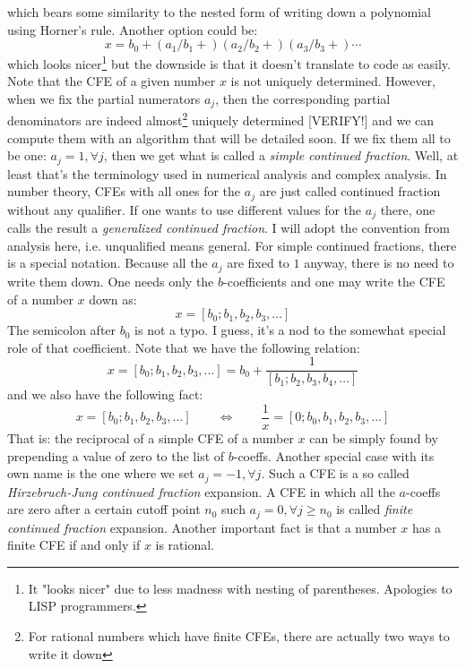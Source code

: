which bears some similarity to the nested form of writing down a polynomial using Horner's rule. Another option could be:
\begin{equation}
x = b_0 + (a_1/b_1+) (a_2/b_2+) (a_3/b_3+) \cdots
\end{equation}
which looks nicer\footnote{It "looks nicer" due to less madness with nesting of parentheses. Apologies to LISP programmers.} but the downside is that it doesn't translate to code as easily. Note that the CFE of a given number $x$ is not uniquely determined. However, when we fix the partial numerators $a_j$, then the corresponding partial denominators are indeed almost\footnote{For rational numbers which have finite CFEs, there are actually two ways to write it down} uniquely determined [VERIFY!] and we can compute them with an algorithm that will be detailed soon. If we fix them all to be one: $a_j = 1, \forall j$, then we get what is called a \emph{simple continued fraction}. Well, at least that's the terminology used in numerical analysis and complex analysis. In number theory, CFEs with all ones for the $a_j$ are just called continued fraction without any qualifier. If one wants to use different values for the $a_j$ there, one calls the result a \emph{generalized continued fraction}. I will adopt the convention from analysis here, i.e. unqualified means general. For simple continued fractions, there is a special notation. Because all the $a_j$ are fixed to $1$ anyway, there is no need to write them down. One needs only the $b$-coefficients and one may write the CFE of a number $x$ down as:
\begin{equation}
x = [b_0; b_1, b_2, b_3, \ldots]
\end{equation}
The semicolon after $b_0$ is not a typo. I guess, it's a nod to the somewhat special role of that coefficient. Note that we have the following relation:
\begin{equation}
x = [b_0; b_1, b_2, b_3, \ldots] = b_0 + \frac{1}{[b_1; b_2, b_3, b_4, \ldots]}
\end{equation}
and we also have the following fact:
\begin{equation}
x = [b_0; b_1, b_2, b_3, \ldots]  
\qquad \Leftrightarrow \qquad
\frac{1}{x} = [0; b_0, b_1, b_2, b_3, \ldots]  
\end{equation}
That is: the reciprocal of a simple CFE of a number $x$ can be simply found by prepending a value of zero to the list of $b$-coeffs. Another special case with its own name is the one where we set  $a_j = -1, \forall j$. Such a CFE is a so called \emph{Hirzebruch-Jung continued fraction} expansion. A CFE in which all the $a$-coeffs are zero after a certain cutoff point $n_0$ such $a_j = 0, \forall j \geq n_0$ is called \emph{finite continued fraction} expansion. Another important fact is that a number $x$ has a finite CFE if and only if $x$ is rational.

